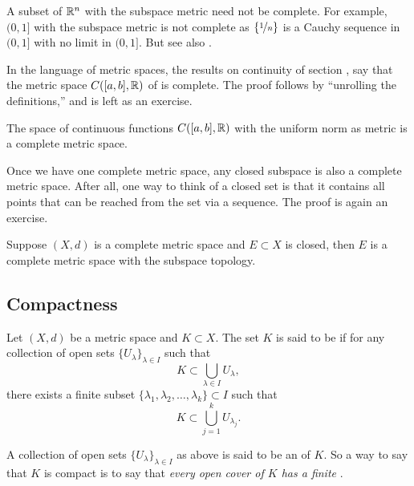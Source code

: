 A subset of ${\mathbb{R}}^n$ with the subspace metric need not be
complete.  For example, $(0,1]$ with the subspace metric is not
complete as $\{ \nicefrac{1}{n} \}$ is a Cauchy sequence in $(0,1]$
with no limit in $(0,1]$.  But see also
.

In the language of metric spaces,
the results on continuity of section ,
say that the metric space
$C([a,b],{\mathbb{R}})$ of  is complete.
The proof follows by ``unrolling the definitions,'' 
and is left as an exercise.

\begin{prop} \label{prop:CabRcomplete}
The space of continuous functions $C([a,b],{\mathbb{R}})$ with the uniform
norm as metric is a complete metric space.
\end{prop}

Once we have one complete metric space, any closed subspace is
also a complete metric space.  After all, one way
to think of a closed set is that it contains all points
that can be reached from the set via a sequence.
The proof is again an exercise.

\begin{prop} \label{prop:closedcomplete}
Suppose $(X,d)$ is a complete metric space and $E \subset X$
is closed, then $E$ is a complete metric space with the subspace topology.
\end{prop}

\subsection{Compactness}

\begin{defn}
Let $(X,d)$ be a metric space and $K \subset X$. 
The set $K$ is said to be \emph{}
if for any collection
of open sets $\{ U_{\lambda} \}_{\lambda \in I}$ such that
\begin{equation*}
K \subset \bigcup_{\lambda \in I} U_\lambda ,
\end{equation*}
there exists a finite subset
$\{ \lambda_1, \lambda_2,\ldots,\lambda_k \} \subset I$
such that
\begin{equation*}
K \subset \bigcup_{j=1}^k U_{\lambda_j} .
\end{equation*}
\end{defn}

A collection of open sets $\{ U_{\lambda} \}_{\lambda \in I}$ as above is
said to be an \emph{} of $K$.  So a way to say that
$K$ is compact is to say that \emph{every open cover of $K$ has a finite
}.


